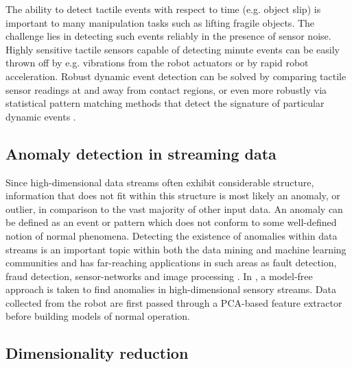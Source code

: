The ability to detect tactile events with respect to time (e.g. object slip) is important to many manipulation tasks such as lifting fragile objects.
The challenge lies in detecting such events reliably in the presence of sensor noise.
Highly sensitive tactile sensors capable of detecting minute events can be easily thrown off by e.g. vibrations from the robot actuators or by rapid robot acceleration.
Robust dynamic event detection can be solved by comparing tactile sensor readings at and away from contact regions, or even more robustly via statistical pattern matching methods that detect the signature of particular dynamic events \cite{tremblay1993estimating}.




\subsection{Anomaly detection in streaming data}

Since high-dimensional data streams often exhibit considerable structure, information that does not fit within this structure is most likely an anomaly, or outlier, in comparison to the vast majority of other input data.
An anomaly can be defined as an event or pattern which does not conform to some well-defined notion of normal phenomena.
Detecting the existence of anomalies within data streams is an important topic within both the data mining and machine learning communities \cite{aggarwal2003framework,kifer2004detecting,dasu2006information,yamanishi2002unifying,song2007statistical} and has far-reaching applications in such areas as fault detection, fraud detection, sensor-networks and image processing \cite{Chandola2009}.
In \cite{hornung2014anomaly}, a model-free approach is taken to find anomalies in high-dimensional sensory streams. Data collected from the robot are first passed through a PCA-based feature extractor before building models of normal operation.


\subsection{Dimensionality reduction}


